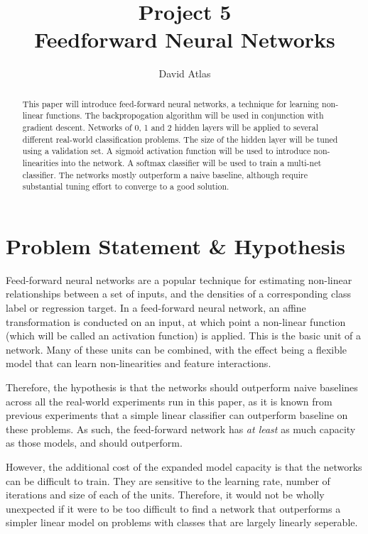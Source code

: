 \documentclass{amsart}
\title{Project 5 \\ Feedforward Neural Networks}
\author{David Atlas}
\begin{document}
    \begin{abstract}
    This paper will introduce feed-forward neural networks, a
        technique for learning non-linear functions. The backpropogation
        algorithm will be used in conjunction with
        gradient descent. Networks of 0, 1 and 2 hidden layers will be
        applied to several different real-world classification
        problems. The size of the hidden
        layer will be tuned using a validation set.
        A sigmoid activation function will
        be used to introduce non-linearities into the network.
        A softmax classifier will be used to train a multi-net
        classifier. The networks mostly outperform
        a naive baseline, although require
        substantial tuning effort to converge to a good solution.
    \end{abstract}
    \maketitle

    \section{Problem Statement \& Hypothesis}
    Feed-forward neural networks are a popular technique for estimating
    non-linear relationships between a set of inputs, and the densities of a
    corresponding class label or regression target. In a feed-forward
    neural network, an affine transformation is conducted on
    an input, at which point a non-linear function (which will be
    called an activation function) is applied. This is the basic
    unit of a network. Many of these units can be combined, with
    the effect being a flexible model that can learn non-linearities
    and feature interactions.

    Therefore, the hypothesis is that the networks should outperform
    naive baselines across all the real-world experiments run in
    this paper, as it is known from previous experiments that
    a simple linear classifier can outperform baseline on these
    problems. As such, the feed-forward network has \textit{at least}
    as much capacity as those models, and should outperform.

    However, the additional cost of the expanded model
    capacity is that the networks can be difficult to train.
    They are sensitive to the learning rate, number of iterations
    and size of each of the units. Therefore, it would not be
    wholly unexpected if it were to be too difficult to find
    a network that outperforms a simpler linear model
    on problems with classes that are largely linearly seperable.
\end{document}
